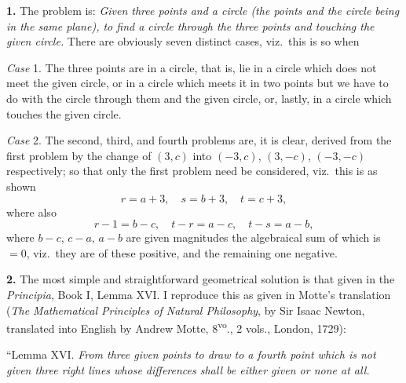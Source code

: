 \documentclass[11pt,a4paper]{book}
\begin{document}
\setcounter{page}{151}


\textbf{1.} The problem is: \textit{Given three points and a circle (the points and the circle being in the same plane), to find a circle through the three points and touching the given circle.} There are obviously seven distinct cases, viz.\ this is so when

\textit{Case} 1. The three points are in a circle, that is, lie in a circle which does not meet the given circle, or in a circle which meets it in two points but we have to do with the circle through them and the given circle, or, lastly, in a circle which touches the given circle.

\textit{Case} 2. The second, third, and fourth problems are, it is clear, derived from the first problem by the change of $(3,c)$ into $(-3,c)$, $(3,-c)$, $(-3,-c)$ respectively; so that only the first problem need be considered, viz.\ this is as shown
\[
r = a + 3, \quad s = b + 3, \quad t = c + 3,
\]
where also
\[
r - 1 = b - c, \quad t - r = a - c, \quad t - s = a - b,
\]
where $b - c$, $c - a$, $a - b$ are given magnitudes the algebraical sum of which is $= 0$, viz.\ they are of these positive, and the remaining one negative.

\textbf{2.} The most simple and straightforward geometrical solution is that given in the \textit{Principia}, Book I, Lemma XVI. I reproduce this as given in Motte's translation (\textit{The Mathematical Principles of Natural Philosophy}, by Sir Isaac Newton, translated into English by Andrew Motte, 8\textsuperscript{vo}., 2 vols., London, 1729):

``Lemma XVI. \textit{From three given points to draw to a fourth point which is not given three right lines whose differences shall be either given or none at all.}
\end{document}
